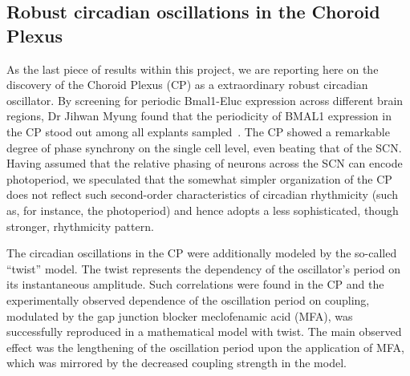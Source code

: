 \subsection{Robust circadian oscillations in the Choroid Plexus}

As the last piece of results within this project, we are reporting
here on the discovery of the Choroid Plexus (CP) as a extraordinary
robust circadian oscillator. By screening for periodic Bmal1-Eluc
expression across different brain regions, Dr Jihwan Myung found that
the periodicity of BMAL1 expression in the CP stood out among all
explants sampled~\cite{myung2017choroid}. The CP showed a remarkable
degree of phase synchrony on the single cell level, even beating that
of the SCN. Having assumed that the relative phasing of neurons across
the SCN can encode photoperiod, we speculated that the somewhat
simpler organization of the CP does not reflect such second-order
characteristics of circadian rhythmicity (such as, for instance, the
photoperiod) and hence adopts a less sophisticated, though stronger,
rhythmicity pattern.

The circadian oscillations in the CP were additionally modeled by the
so-called ``twist'' model. The twist represents the dependency of the
oscillator's period on its instantaneous amplitude. Such correlations
were found in the CP and the experimentally observed dependence of the
oscillation period on coupling, modulated by the gap junction blocker
meclofenamic acid (MFA), was successfully reproduced in a mathematical
model with twist. The main observed effect was the lengthening of the
oscillation period upon the application of MFA, which was mirrored by
the decreased coupling strength in the model.
